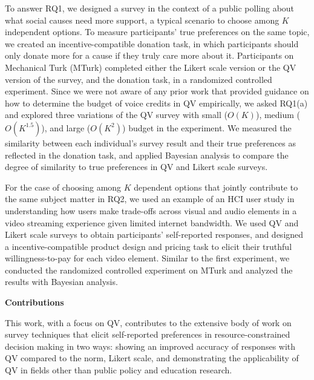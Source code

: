 To answer RQ1, we designed a survey in the context of a public polling about what social causes need more support, a typical scenario to choose among $K$ independent options. To measure participants' true preferences on the same topic, we created an incentive-compatible donation task, in which participants should only donate more for a cause if they truly care more about it. Participants on Mechanical Turk (MTurk) completed either the Likert scale version or the QV version of the survey, and the donation task, in a randomized controlled experiment. Since we were not aware of any prior work that provided guidance on how to determine the budget of voice credits in QV empirically, we asked RQ1(a) and explored three variations of the QV survey with small ($O(K)$), medium ($O(K^{1.5})$), and large ($O(K^2)$) budget in the experiment. We measured the similarity between each individual's survey result and their true preferences as reflected in the donation task, and applied Bayesian analysis to compare the degree of similarity to true preferences in QV and Likert scale surveys.

For the case of choosing among $K$ dependent options that jointly contribute to the same subject matter in RQ2, we used an example of an HCI user study in understanding how users make trade-offs across visual and audio elements in a video streaming experience given limited internet bandwidth. We used QV and Likert scale surveys to obtain participants' self-reported responses, and designed a incentive-compatible product design and pricing task to elicit their truthful willingness-to-pay for each video element. Similar to the first experiment, we conducted the randomized controlled experiment on MTurk and analyzed the results with Bayesian analysis.

\textbf{Contributions}

This work, with a focus on QV, contributes to the extensive body of work on survey techniques that elicit self-reported preferences in resource-constrained decision making in two ways: showing an improved accuracy of responses with QV compared to the norm, Likert scale, and demonstrating the applicability of QV in fields other than public policy and education research.

